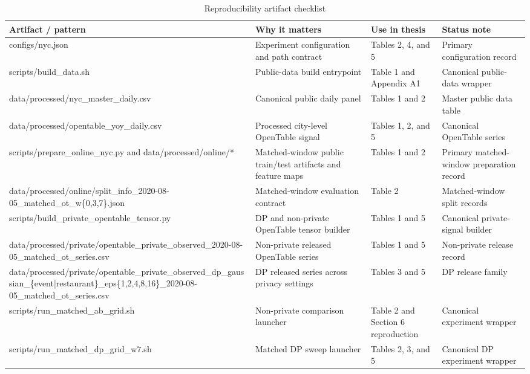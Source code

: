 \begin{table}[!htbp]
\centering
\footnotesize
\begin{threeparttable}
\caption{Reproducibility artifact checklist}
\label{tab:reproducibility_checklist}
\begin{tabularx}{\textwidth}{>{\raggedright\arraybackslash}p{}>{\raggedright\arraybackslash}p{}>{\raggedright\arraybackslash}p{}>{\raggedright\arraybackslash}X}
\toprule
Artifact / pattern & Why it matters & Use in thesis & Status note \\
\midrule
configs/nyc.json & Experiment configuration and path contract & Tables 2, 4, and 5 & Primary configuration record \\
scripts/build\_data.sh & Public-data build entrypoint & Table 1 and Appendix A1 & Canonical public-data wrapper \\
data/processed/nyc\_master\_daily.csv & Canonical public daily panel & Tables 1 and 2 & Master public data table \\
data/processed/opentable\_yoy\_daily.csv & Processed city-level OpenTable signal & Tables 1, 2, and 5 & Canonical OpenTable series \\
scripts/prepare\_online\_nyc.py and data/processed/online/* & Matched-window public train/test artifacts and feature maps & Tables 1 and 2 & Primary matched-window preparation record \\
data/processed/online/split\_info\_2020-08-05\_matched\_ot\_w\{0,3,7\}.json & Matched-window evaluation contract & Table 2 & Matched-window split records \\
scripts/build\_private\_opentable\_tensor.py & DP and non-private OpenTable tensor builder & Tables 1 and 5 & Canonical private-signal builder \\
data/processed/private/opentable\_private\_observed\_2020-08-05\_matched\_ot\_series.csv & Non-private released OpenTable series & Tables 1 and 5 & Non-private release record \\
data/processed/private/opentable\_private\_observed\_dp\_gaussian\_\{event|restaurant\}\_eps\{1,2,4,8,16\}\_2020-08-05\_matched\_ot\_series.csv & DP released series across privacy settings & Tables 3 and 5 & DP release family \\
scripts/run\_matched\_ab\_grid.sh & Non-private comparison launcher & Table 2 and Section 6 reproduction & Canonical experiment wrapper \\
scripts/run\_matched\_dp\_grid\_w7.sh & Matched DP sweep launcher & Tables 2, 3, and 5 & Canonical DP experiment wrapper \\

\end{tabularx}
\end{threeparttable}
\end{table}

